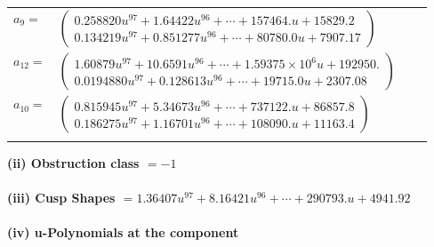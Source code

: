 \documentclass[1p]{elsarticle_modified}
\theoremstyle{definition}
\begin{document}
\begin{tabular}{m{7pt} m{180pt} m{7pt} m{180pt} }
\flushright $a_{9}=$&$\begin{pmatrix}0.258820 u^{97}+1.64422 u^{96}+\cdots+157464. u+15829.2\\0.134219 u^{97}+0.851277 u^{96}+\cdots+80780.0 u+7907.17\end{pmatrix}$ \\
\flushright $a_{12}=$&$\begin{pmatrix}1.60879 u^{97}+10.6591 u^{96}+\cdots+1.59375\times10^{6} u+192950.\\0.0194880 u^{97}+0.128613 u^{96}+\cdots+19715.0 u+2307.08\end{pmatrix}$ \\
\flushright $a_{10}=$&$\begin{pmatrix}0.815945 u^{97}+5.34673 u^{96}+\cdots+737122. u+86857.8\\0.186275 u^{97}+1.16701 u^{96}+\cdots+108090. u+11163.4\end{pmatrix}$\\&\end{tabular}
\flushleft \textbf{(ii) Obstruction class $= -1$}\\~\\
\flushleft \textbf{(iii) Cusp Shapes $= 1.36407 u^{97}+8.16421 u^{96}+\cdots+290793. u+4941.92$}\\~\\
\newpage\renewcommand{\arraystretch}{1}
\flushleft \textbf{(iv) u-Polynomials at the component}\newline \\
\end{document}
